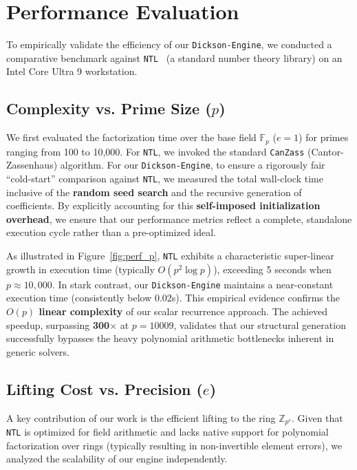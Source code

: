 \documentclass[12pt]{article}
\theoremstyle{plain}
\numberwithin{equation}{section}
\begin{document}
\section{Performance Evaluation}
\label{sec:performance}

To empirically validate the efficiency of our \texttt{Dickson-Engine}, we conducted a comparative benchmark against \texttt{NTL}~\cite{ntl} (a standard number theory library) on an Intel Core Ultra 9 workstation.

\subsection{Complexity vs. Prime Size ($p$)}

We first evaluated the factorization time over the base field $\mathbb{F}_p$ ($e=1$) for primes ranging from 100 to 10,000. For \texttt{NTL}, we invoked the standard \texttt{CanZass} (Cantor-Zassenhaus) algorithm. For our \texttt{Dickson-Engine}, to ensure a rigorously fair ``cold-start'' comparison against \texttt{NTL}, we measured the total wall-clock time inclusive of the \textbf{random seed search} and the recursive generation of coefficients. By explicitly accounting for this \textbf{self-imposed initialization overhead}, we ensure that our performance metrics reflect a complete, standalone execution cycle rather than a pre-optimized ideal.

As illustrated in Figure~\ref{fig:perf_p}, \texttt{NTL} exhibits a characteristic super-linear growth in execution time (typically $O(p^2 \log p)$), exceeding 5 seconds when $p \approx 10,000$. In stark contrast, our \texttt{Dickson-Engine} maintains a near-constant execution time (consistently below 0.02s). This empirical evidence confirms the \textbf{$O(p)$ linear complexity} of our scalar recurrence approach. The achieved speedup, surpassing \textbf{300$\times$} at $p=10009$, validates that our structural generation successfully bypasses the heavy polynomial arithmetic bottlenecks inherent in generic solvers.

\subsection{Lifting Cost vs. Precision ($e$)}

A key contribution of our work is the efficient lifting to the ring $\mathbb{Z}_{p^e}$. Given that \texttt{NTL} is optimized for field arithmetic and lacks native support for polynomial factorization over rings (typically resulting in non-invertible element errors), we analyzed the scalability of our engine independently.
\end{document}
